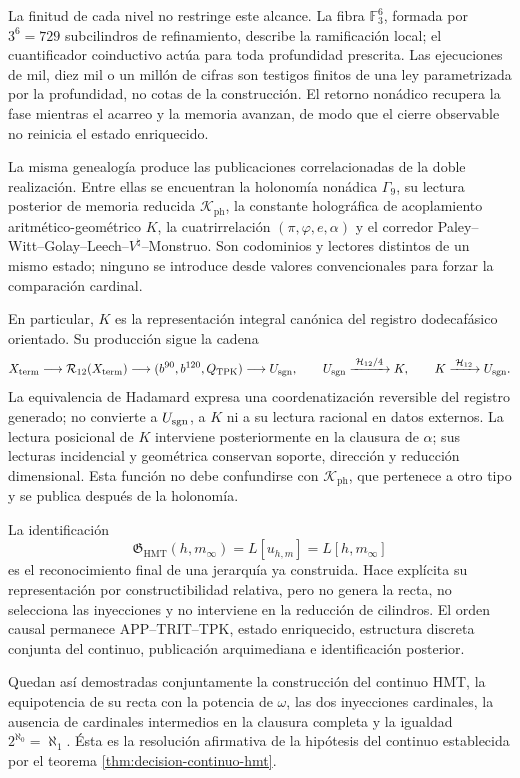 La finitud de cada nivel no restringe este alcance. La fibra
\(\mathbb F_3^6\), formada por \(3^6=729\) subcilindros de refinamiento,
describe la ramificación local; el cuantificador coinductivo actúa para toda
profundidad prescrita. Las ejecuciones de mil, diez mil o un millón de cifras
son testigos finitos de una ley parametrizada por la profundidad, no cotas de
la construcción. El retorno nonádico recupera la fase mientras el acarreo y la
memoria avanzan, de modo que el cierre observable no reinicia el estado
enriquecido.

La misma genealogía produce las publicaciones correlacionadas de la doble
realización. Entre ellas se encuentran la holonomía nonádica
\(\Gamma_9\), su lectura posterior de memoria reducida
\(\mathcal K_{\mathrm{ph}}\), la constante holográfica de acoplamiento
aritmético-geométrico \(K\), la cuatrirrelación
\((\pi,\varphi,e,\alpha)\) y el corredor
Paley--Witt--Golay--Leech--\(V^\natural\)--Monstruo. Son codominios y
lectores distintos de un mismo estado; ninguno se introduce desde valores
convencionales para forzar la comparación cardinal.

En particular, \(K\) es la representación integral canónica del registro
dodecafásico orientado. Su producción sigue la cadena
\[
 X_{\rm term}\longrightarrow\mathcal R_{12}(X_{\rm term})
 \longrightarrow(b^{90},b^{120},Q_{\rm TPK})
 \longrightarrow U_{\rm sgn},
 \qquad
 U_{\rm sgn}\xrightarrow{\;\mathcal H_{12}/4\;}K,
 \qquad
 K\xrightarrow{\;\mathcal H_{12}\;}U_{\rm sgn}.
\]
La equivalencia de Hadamard expresa una coordenatización reversible del
registro generado; no convierte a \(U_{\rm sgn}\), a \(K\) ni a su lectura
racional en datos externos. La lectura posicional de \(K\) interviene
posteriormente en la clausura de \(\alpha\); sus lecturas incidencial y
geométrica conservan soporte, dirección y reducción dimensional. Esta función
no debe confundirse con \(\mathcal K_{\mathrm{ph}}\), que pertenece a otro
tipo y se publica después de la holonomía.

La identificación
\[
 \mathfrak G_{\mathrm{HMT}}(h,m_\infty)
 =L[u_{h,m}]=L[h,m_\infty]
\]
es el reconocimiento final de una jerarquía ya construida. Hace explícita su
representación por constructibilidad relativa, pero no genera la recta, no
selecciona las inyecciones y no interviene en la reducción de cilindros. El
orden causal permanece APP--TRIT--TPK, estado enriquecido, estructura discreta
conjunta del continuo, publicación arquimediana e identificación posterior.

Quedan así demostradas conjuntamente la construcción del continuo HMT, la
equipotencia de su recta con la potencia de \(\omega\), las dos inyecciones
cardinales, la ausencia de cardinales intermedios en la clausura completa y la
igualdad \(2^{\aleph_0}=\aleph_1\). Ésta es la resolución afirmativa de la
hipótesis del continuo establecida por el teorema
\ref{thm:decision-continuo-hmt}.
\endgroup
